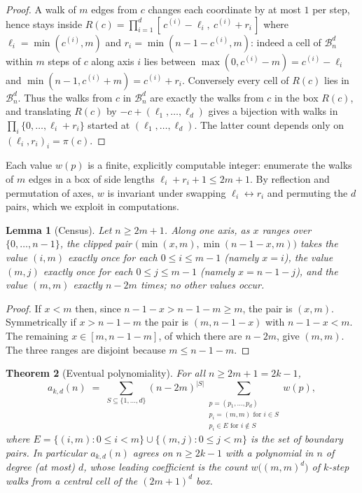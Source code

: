 \documentclass[11pt]{article}
\newtheorem{theorem}{Theorem}[section]
\newtheorem{lemma}[theorem]{Lemma}
\newcommand{\GBox}{\mathcal{B}}
\begin{document}
\begin{proof}
A walk of $m$ edges from $c$ changes each coordinate by at most $1$ per
step, hence stays inside
$R(c) = \prod_{i=1}^{d} [\,c^{(i)}-\ell_i,\ c^{(i)}+r_i\,]$
where $\ell_i = \min(c^{(i)}, m)$ and $r_i = \min(n-1-c^{(i)}, m)$:
indeed a cell of $\GBox_n^d$ within $m$ steps of $c$ along axis $i$ lies
between $\max(0, c^{(i)}-m) = c^{(i)}-\ell_i$ and
$\min(n-1, c^{(i)}+m) = c^{(i)}+r_i$.  Conversely every cell of $R(c)$
lies in $\GBox_n^d$.  Thus the walks from $c$ in $\GBox_n^d$ are exactly
the walks from $c$ in the box $R(c)$, and translating $R(c)$ by $-c +
(\ell_1,\dots,\ell_d)$ gives a bijection with walks in
$\prod_i \{0,\dots,\ell_i+r_i\}$ started at $(\ell_1,\dots,\ell_d)$.
The latter count depends only on
$(\ell_i, r_i)_i = \pi(c)$.
\end{proof}

Each value $w(p)$ is a finite, explicitly computable integer: enumerate
the walks of $m$ edges in a box of side lengths $\ell_i + r_i + 1 \le
2m+1$.  By reflection and permutation of axes, $w$ is invariant under
swapping $\ell_i \leftrightarrow r_i$ and permuting the $d$ pairs, which
we exploit in computations.

\begin{lemma}[Census]\label{lem:census}
Let $n \ge 2m+1$.  Along one axis, as $x$ ranges over $\{0,\dots,n-1\}$,
the clipped pair $\bigl(\min(x,m), \min(n-1-x,m)\bigr)$ takes the value
$(i, m)$ exactly once for each $0 \le i \le m-1$ (namely $x = i$), the
value $(m, j)$ exactly once for each $0 \le j \le m-1$ (namely
$x = n-1-j$), and the value $(m, m)$ exactly $n - 2m$ times; no other
values occur.
\end{lemma}

\begin{proof}
If $x < m$ then, since $n - 1 - x > n - 1 - m \ge m$, the pair is
$(x, m)$.  Symmetrically if $x > n-1-m$ the pair is $(m, n-1-x)$ with
$n-1-x < m$.  The remaining $x \in [m, n-1-m]$, of which there are
$n-2m$, give $(m,m)$.  The three ranges are disjoint because
$m \le n-1-m$.
\end{proof}

\begin{theorem}[Eventual polynomiality]\label{thm:main}
For all $n \ge 2m + 1 = 2k - 1$,
\[
  a_{k,d}(n) \;=\; \sum_{S \subseteq \{1,\dots,d\}} (n-2m)^{|S|}
  \sum_{\substack{p = (p_1,\dots,p_d)\\ p_i = (m,m) \text{ for } i \in S\\
      p_i \in E \text{ for } i \notin S}} w(p),
\]
where $E = \{(i,m) : 0 \le i < m\} \cup \{(m,j) : 0 \le j < m\}$ is the
set of boundary pairs.  In particular $a_{k,d}(n)$ agrees on
$n \ge 2k-1$ with a polynomial in $n$ of degree (at most) $d$, whose
leading coefficient is the count $w\bigl((m,m)^d\bigr)$ of $k$-step walks
from a central cell of the $(2m{+}1)^d$ box.
\end{theorem}
\end{document}
